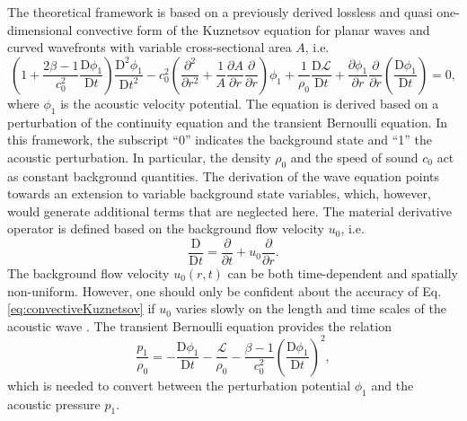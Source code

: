 The theoretical framework is based on a previously derived lossless and quasi one-dimensional convective form of the Kuznetsov equation for planar waves and curved wavefronts with variable cross-sectional area $A$, i.e.
\begin{equation}
\left(1 + \dfrac{2\beta - 1}{c_0^2}\dfrac{\mathrm{D}\phi_1}{\mathrm{D}t}\right)\dfrac{\mathrm{D}^2\phi_1}{\mathrm{D}t^2}
- c_0^2\left(\dfrac{\partial^2}{\partial r^2} + \dfrac{1}{A}\dfrac{\partial A}{\partial
r}\dfrac{\partial}{\partial r}\right)\phi_1
+ \dfrac{1}{\rho_0}\dfrac{\mathrm{D}\mathcal{L}}{\mathrm{D}t}
+ \dfrac{\partial \phi_1}{\partial r}\dfrac{\partial}{\partial r}\left(\dfrac{\mathrm{D}\phi_1}{\mathrm{D}t}\right) = 0,
\label{eq:convectiveKuznetsov}
\end{equation}
where $\phi_1$ is the acoustic velocity potential. The equation is derived based on a perturbation of the continuity equation and the transient Bernoulli equation. In this framework, the subscript ``0'' indicates the background state and ``1'' the acoustic perturbation. In particular, the density $\rho_0$ and the speed of sound $c_0$ act as constant background quantities. The derivation of the wave equation points towards an extension to variable background state variables, which, however, would generate additional terms that are neglected here. The material derivative operator is defined based on the background flow velocity $u_0$, i.e.
\begin{equation}
\dfrac{\mathrm{D}}{\mathrm{D}t} = \dfrac{\partial}{\partial t} + u_0 \dfrac{\partial}{\partial r}.
\label{eq:MaterialDerivative}
\end{equation}
The background flow velocity $u_0\left(r,t\right)$ can be both time-dependent and spatially non-uniform. However, one should only be confident about the accuracy of Eq. \eqref{eq:convectiveKuznetsov} if $u_0$ varies slowly on the length and time scales of the acoustic wave \citep{Pierce_1990}. The transient Bernoulli equation provides the relation
\begin{equation}
\dfrac{p_1}{\rho_0} = - \dfrac{\mathrm{D}\phi_1}{\mathrm{D}t} - \dfrac{\mathcal{L}}{\rho_0} - \dfrac{\beta - 1}{c_0^2}\left(\dfrac{\mathrm{D}\phi_1}{\mathrm{D}t}\right)^2,
\label{eq:p1pi1}
\end{equation}
which is needed to convert between the perturbation potential $\phi_1$ and the acoustic pressure $p_1$.

